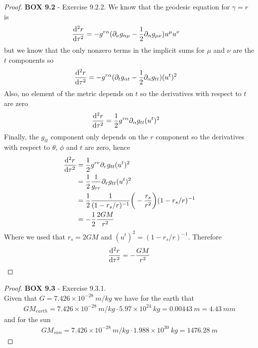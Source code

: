 \documentclass[11pt]{article}
\theoremstyle{definition}
\begin{document}
\begin{proof}{\textbf{BOX 9.2} - Exercise 9.2.2.}
    We know that the geodesic equation for $\gamma = r$ is
    \begin{align*}
        \derivative[2]{r}{\tau}
        &= -g^{r\alpha}(\partial_\nu g_{\alpha\mu}
        - \frac{1}{2}\partial_\alpha g_{\mu\nu}) u^\mu u^\nu
    \end{align*}
    but we know that the only nonzero terms in the implicit sums for $\mu$ and
    $\nu$ are the $t$ components so
    \begin{align*}
        \derivative[2]{r}{\tau}
        &= -g^{r\alpha}(\partial_t g_{\alpha t}
        - \frac{1}{2}\partial_\alpha g_{tt}) (u^t)^2
    \end{align*}
    Also, no element of the metric depends on $t$ so the derivatives with
    respect to $t$ are zero
    \begin{align*}
        \derivative[2]{r}{\tau}
        &= \frac{1}{2}g^{r\alpha} \partial_\alpha g_{tt} (u^t)^2
    \end{align*}
    Finally, the $g_{tt}$ component only depends on the $r$ component so
    the derivatives with respect to $\theta$, $\phi$ and $t$ are zero, hence
    \begin{align*}
        \derivative[2]{r}{\tau}
        &= \frac{1}{2}g^{rr} \partial_r g_{tt} (u^t)^2\\
        &= \frac{1}{2}\frac{1}{g_{rr}} \partial_r g_{tt} (u^t)^2\\
        &= \frac{1}{2}\frac{1}{(1 - r_s/r)^{-1}} \bigg(-\frac{r_s}{r^2}\bigg)
        (1 - r_s/r)^{-1}\\
        &= -\frac{1}{2} \frac{2GM}{r^2}
    \end{align*}
    Where we used that $r_s = 2GM$ and $(u^t)^2 = (1 - r_s/r)^{-1}$. Therefore
    \begin{align*}
        \derivative[2]{r}{\tau} = -\frac{GM}{r^2}
    \end{align*}
\end{proof}
\cleardoublepage
\begin{proof}{\textbf{BOX 9.3} - Exercise 9.3.1.}\\
    Given that $G = 7.426 \times 10^{-28}~m/kg$ we have for the earth that
    \begin{align*}
        GM_{earth} = 7.426 \times 10^{-28}~m/kg \cdot 5.97 \times 10^{24}~kg
        = 0.00443~m = 4.43~mm
    \end{align*}
    and for the sun
    \begin{align*}
        GM_{sun} = 7.426 \times 10^{-28}~m/kg \cdot 1.988 \times 10^{30}~kg
        = 1476.28~m
    \end{align*}
\end{proof}
\end{document}
